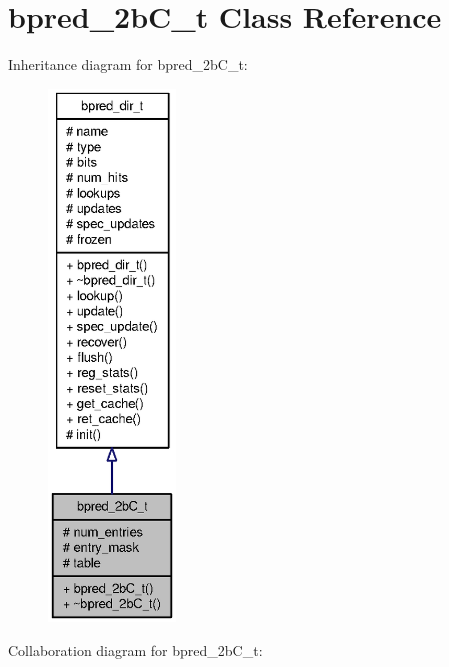 \section{bpred\_\-2bC\_\-t Class Reference}
\label{classbpred__2bC__t}
Inheritance diagram for bpred\_\-2bC\_\-t:\nopagebreak
\begin{figure}[H]
\begin{center}
\leavevmode
\includegraphics[height=400pt]{classbpred__2bC__t__inherit__graph}
\end{center}
\end{figure}
Collaboration diagram for bpred\_\-2bC\_\-t:\nopagebreak
